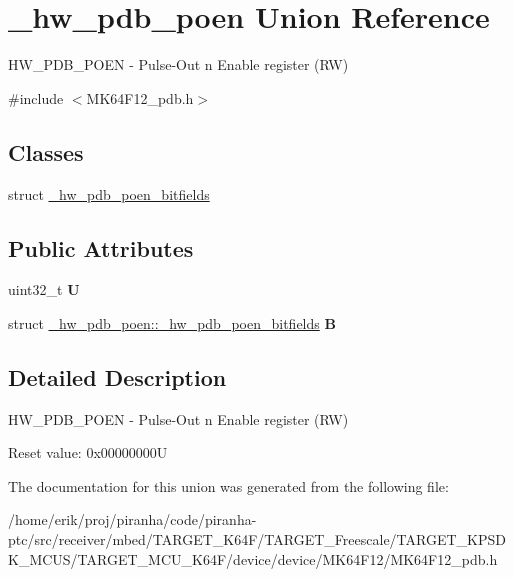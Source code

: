 \hypertarget{union__hw__pdb__poen}{}\section{\+\_\+hw\+\_\+pdb\+\_\+poen Union Reference}
\label{union__hw__pdb__poen}


H\+W\+\_\+\+P\+D\+B\+\_\+\+P\+O\+EN -\/ Pulse-\/\+Out n Enable register (RW)  




{\ttfamily \#include $<$M\+K64\+F12\+\_\+pdb.\+h$>$}

\subsection*{Classes}
\begin{DoxyCompactItemize}
\item 
struct \hyperlink{struct__hw__pdb__poen_1_1__hw__pdb__poen__bitfields}{\+\_\+hw\+\_\+pdb\+\_\+poen\+\_\+bitfields}
\end{DoxyCompactItemize}
\subsection*{Public Attributes}
\begin{DoxyCompactItemize}
\item 
uint32\+\_\+t {\bfseries U}\hypertarget{union__hw__pdb__poen_a89eae4e1739a9e24ba8c9e42d49e9465}{}\label{union__hw__pdb__poen_a89eae4e1739a9e24ba8c9e42d49e9465}

\item 
struct \hyperlink{struct__hw__pdb__poen_1_1__hw__pdb__poen__bitfields}{\+\_\+hw\+\_\+pdb\+\_\+poen\+::\+\_\+hw\+\_\+pdb\+\_\+poen\+\_\+bitfields} {\bfseries B}\hypertarget{union__hw__pdb__poen_a568438d447cfae77f8f18a7b4fd99030}{}\label{union__hw__pdb__poen_a568438d447cfae77f8f18a7b4fd99030}

\end{DoxyCompactItemize}


\subsection{Detailed Description}
H\+W\+\_\+\+P\+D\+B\+\_\+\+P\+O\+EN -\/ Pulse-\/\+Out n Enable register (RW) 

Reset value\+: 0x00000000U 

The documentation for this union was generated from the following file\+:\begin{DoxyCompactItemize}
\item 
/home/erik/proj/piranha/code/piranha-\/ptc/src/receiver/mbed/\+T\+A\+R\+G\+E\+T\+\_\+\+K64\+F/\+T\+A\+R\+G\+E\+T\+\_\+\+Freescale/\+T\+A\+R\+G\+E\+T\+\_\+\+K\+P\+S\+D\+K\+\_\+\+M\+C\+U\+S/\+T\+A\+R\+G\+E\+T\+\_\+\+M\+C\+U\+\_\+\+K64\+F/device/device/\+M\+K64\+F12/M\+K64\+F12\+\_\+pdb.\+h\end{DoxyCompactItemize}
